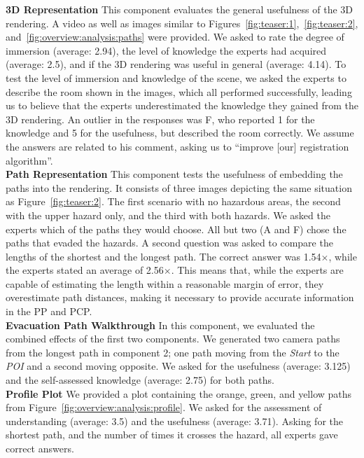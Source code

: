\documentclass[conference,10pt,letter]{IEEEtran}
\begin{document}
\noindent \textbf{3D Representation} This component evaluates the general usefulness of the 3D rendering. A video as well as images similar to Figures~\ref{fig:teaser:1},~\ref{fig:teaser:2}, and~\ref{fig:overview:analysis:paths} were provided. We asked to rate the degree of immersion (average: 2.94), the level of knowledge the experts had acquired (average: 2.5), and if the 3D rendering was useful in general (average: 4.14). To test the level of immersion and knowledge of the scene, we asked the experts to describe the room shown in the images, which all performed successfully, leading us to believe that the experts underestimated the knowledge they gained from the 3D rendering. An outlier in the responses was F, who reported 1 for the knowledge and 5 for the usefulness, but described the room correctly. We assume the answers are related to his comment, asking us to ``improve [our] registration algorithm''. \\
%
\noindent \textbf{Path Representation} This component tests the usefulness of embedding the paths into the rendering. It consists of three images depicting the same situation as Figure~\ref{fig:teaser:2}. The first scenario with no hazardous areas, the second with the upper hazard only, and the third with both hazards. We asked the experts which of the paths they would choose. All but two (A and F) chose the paths that evaded the hazards. A second question was asked to compare the lengths of the shortest and the longest path. The correct answer was 1.54$\times$, while the experts stated an average of 2.56$\times$. This means that, while the experts are capable of estimating the length within a reasonable margin of error, they overestimate path distances, making it necessary to provide accurate information in the PP and PCP. \\
%
\noindent \textbf{Evacuation Path Walkthrough} In this component, we evaluated the combined effects of the first two components. We generated two camera paths from the longest path in component 2; one path moving from the \emph{Start} to the \emph{POI} and a second moving opposite. We asked for the usefulness (average: 3.125) and the self-assessed knowledge (average: 2.75) for both paths. \\
%
\noindent \textbf{Profile Plot} We provided a plot containing the orange, green, and yellow paths from Figure~\ref{fig:overview:analysis:profile}. We asked for the assessment of understanding (average: 3.5) and the usefulness (average: 3.71). Asking for the shortest path, and the number of times it crosses the hazard, all experts gave correct answers. \\
\end{document}
